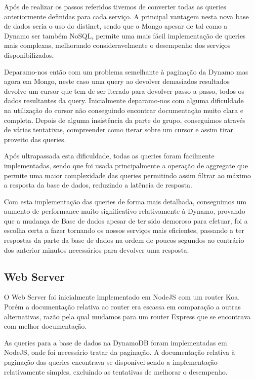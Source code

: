 \documentclass[11pt,a4paper]{article}
\begin{document}
Após de realizar os passos referidos tivemos de converter todas as queries anteriormente definidas para cada serviço. A principal vantagem nesta nova base de dados seria o uso do distinct, sendo que o Mongo apesar de tal como a Dynamo  ser também NoSQL, permite uma mais fácil implementação de queries mais complexas, melhorando consideravelmente o desempenho dos serviços disponibilizados. 

Deparamo-nos então com um problema semelhante à paginação da Dynamo mas agora em Mongo, neste caso uma query ao devolver demasiados resultados devolve um cursor que tem de ser iterado para devolver passo a passo, todos os dados resultantes da query. Inicialmente deparamo-nos com alguma dificuldade na utilização do cursor não conseguindo encontrar documentação muito clara e completa. Depois de alguma insistência da parte do grupo, conseguimos através de várias tentativas, compreender como iterar sobre um cursor e assim tirar proveito das queries. 

Após ultrapassada esta dificuldade, todas as queries foram facilmente implementadas, sendo que foi usada principalmente a operação de aggregate que permite uma maior complexidade das queries permitindo assim filtrar ao máximo a resposta da base de dados, reduzindo a latência de resposta.

Com esta implementação das queries de forma mais detalhada, conseguimos um aumento de performance muito significativo relativamente à Dynamo, provando que a mudança de Base de dados apesar de ter sido demoroso para efetuar, foi a escolha certa a fazer tornando os nossos serviços mais eficientes, passando a ter respostas da parte da base de dados na ordem de poucos segundos ao contrário dos anterior minutos necessários para devolver uma resposta.

\subsection{Web Server}
O Web Server foi inicialmente implementado em NodeJS com um router Koa. Porém a documentação relativa ao router era escassa em comparação a outras alternativas, razão pela qual mudamos para um router Express que se encontrava com melhor documentação.

As queries para a base de dados na DynamoDB foram implementadas em NodeJS, onde foi necessário tratar da paginação. A documentação relativa à paginação das queries encontrava-se disponível sendo a implementação relativamente simples, excluindo as tentativas de melhorar o desempenho.
\end{document}
